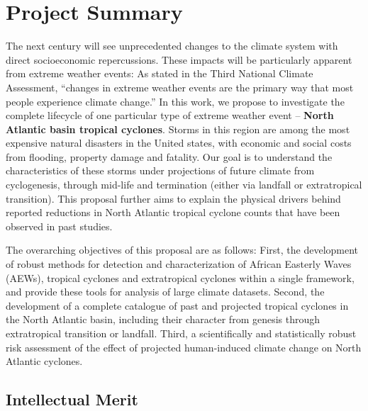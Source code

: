 \documentclass[11pt]{article}
\begin{document}
\appendix

\addtocounter{section}{1}

\section{Project Summary}
\vspace{-0.2cm}

The next century will see unprecedented changes to the climate system with direct socioeconomic repercussions.  These impacts will be particularly apparent from extreme weather events: As stated in the Third National Climate Assessment, ``changes in extreme weather events are the primary way that most people experience climate change.''  In this work, we propose to investigate the complete lifecycle of one particular type of extreme weather event -- \textbf{North Atlantic basin tropical cyclones}.  Storms in this region are among the most expensive natural disasters in the United states, with economic and social costs from flooding, property damage and fatality.  Our goal is to understand the characteristics of these storms under projections of future climate from cyclogenesis, through mid-life and termination (either via landfall or extratropical transition).  This proposal  further aims to explain the physical drivers behind reported reductions in North Atlantic tropical cyclone counts that have been observed in past studies.

The overarching objectives of this proposal are as follows:  First, the development of robust methods for detection and characterization of African Easterly Waves (AEWs), tropical cyclones and extratropical cyclones within a single framework, and provide these tools for analysis of large climate datasets.  Second, the development of a complete catalogue of past and projected tropical cyclones in the North Atlantic basin, including their character from genesis through extratropical transition or landfall.  Third, a scientifically and statistically robust risk assessment of the effect of projected human-induced climate change on North Atlantic cyclones.

\vspace{-0.7cm}
\subsection*{Intellectual Merit}
\vspace{-0.6cm}
\end{document}

